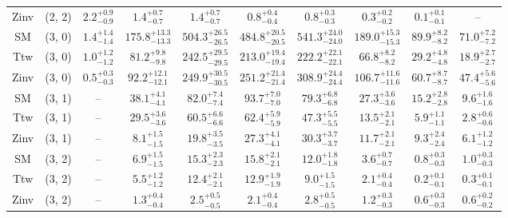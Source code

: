 \begin{table}[h!]
{\begin{tabular}{cccccccccc}
	Zinv & (2, 2) & $2.2^{+ 0.9 }_{- 0.9 }$ & $1.4^{+ 0.7 }_{- 0.7 }$ & $1.4^{+ 0.7 }_{- 0.7 }$ & $0.8^{+ 0.4 }_{- 0.4 }$ & $0.8^{+ 0.3 }_{- 0.3 }$ & $0.3^{+ 0.2 }_{- 0.2 }$ & $0.1^{+ 0.1 }_{- 0.1 }$ & -- \\[0.5ex] 
	SM & (3, 0) & $1.4^{+ 1.4 }_{- 1.4 }$ & $175.8^{+ 13.3 }_{- 13.3 }$ & $504.3^{+ 26.5 }_{- 26.5 }$ & $484.8^{+ 20.5 }_{- 20.5 }$ & $541.3^{+ 24.0 }_{- 24.0 }$ & $189.0^{+ 15.3 }_{- 15.3 }$ & $89.9^{+ 8.2 }_{- 8.2 }$ & $71.0^{+ 7.2 }_{- 7.2 }$ \\[0.5ex] 
	Ttw & (3, 0) & $1.0^{+ 1.2 }_{- 1.2 }$ & $81.2^{+ 9.8 }_{- 9.8 }$ & $242.5^{+ 29.5 }_{- 29.5 }$ & $213.0^{+ 19.4 }_{- 19.4 }$ & $222.2^{+ 22.1 }_{- 22.1 }$ & $66.8^{+ 8.2 }_{- 8.2 }$ & $29.2^{+ 4.8 }_{- 4.8 }$ & $18.9^{+ 2.7 }_{- 2.7 }$ \\[0.5ex] 
	Zinv & (3, 0) & $0.5^{+ 0.3 }_{- 0.3 }$ & $92.2^{+ 12.1 }_{- 12.1 }$ & $249.9^{+ 30.5 }_{- 30.5 }$ & $251.2^{+ 21.4 }_{- 21.4 }$ & $308.9^{+ 24.4 }_{- 24.4 }$ & $106.7^{+ 11.6 }_{- 11.6 }$ & $60.7^{+ 8.7 }_{- 8.7 }$ & $47.4^{+ 5.6 }_{- 5.6 }$ \\[0.5ex] 
	SM & (3, 1) & -- & $38.1^{+ 4.1 }_{- 4.1 }$ & $82.0^{+ 7.4 }_{- 7.4 }$ & $93.7^{+ 7.0 }_{- 7.0 }$ & $79.3^{+ 6.8 }_{- 6.8 }$ & $27.3^{+ 3.6 }_{- 3.6 }$ & $15.2^{+ 2.8 }_{- 2.8 }$ & $9.6^{+ 1.6 }_{- 1.6 }$ \\[0.5ex] 
	Ttw & (3, 1) & -- & $29.5^{+ 3.6 }_{- 3.6 }$ & $60.5^{+ 6.6 }_{- 6.6 }$ & $62.4^{+ 5.9 }_{- 5.9 }$ & $47.3^{+ 5.5 }_{- 5.5 }$ & $13.5^{+ 2.1 }_{- 2.1 }$ & $5.9^{+ 1.1 }_{- 1.1 }$ & $2.8^{+ 0.6 }_{- 0.6 }$ \\[0.5ex] 
	Zinv & (3, 1) & -- & $8.1^{+ 1.5 }_{- 1.5 }$ & $19.8^{+ 3.5 }_{- 3.5 }$ & $27.3^{+ 4.1 }_{- 4.1 }$ & $30.3^{+ 3.7 }_{- 3.7 }$ & $11.7^{+ 2.1 }_{- 2.1 }$ & $9.3^{+ 2.4 }_{- 2.4 }$ & $6.1^{+ 1.2 }_{- 1.2 }$ \\[0.5ex] 
	SM & (3, 2) & -- & $6.9^{+ 1.5 }_{- 1.5 }$ & $15.3^{+ 2.3 }_{- 2.3 }$ & $15.8^{+ 2.1 }_{- 2.1 }$ & $12.0^{+ 1.8 }_{- 1.8 }$ & $3.6^{+ 0.7 }_{- 0.7 }$ & $0.8^{+ 0.3 }_{- 0.3 }$ & $1.0^{+ 0.3 }_{- 0.3 }$ \\[0.5ex] 
	Ttw & (3, 2) & -- & $5.5^{+ 1.2 }_{- 1.2 }$ & $12.4^{+ 2.1 }_{- 2.1 }$ & $12.9^{+ 1.9 }_{- 1.9 }$ & $9.0^{+ 1.5 }_{- 1.5 }$ & $2.1^{+ 0.4 }_{- 0.4 }$ & $0.2^{+ 0.1 }_{- 0.1 }$ & $0.3^{+ 0.1 }_{- 0.1 }$ \\[0.5ex] 
	Zinv & (3, 2) & -- & $1.3^{+ 0.4 }_{- 0.4 }$ & $2.5^{+ 0.5 }_{- 0.5 }$ & $2.1^{+ 0.4 }_{- 0.4 }$ & $2.8^{+ 0.5 }_{- 0.5 }$ & $1.2^{+ 0.3 }_{- 0.3 }$ & $0.6^{+ 0.3 }_{- 0.3 }$ & $0.6^{+ 0.2 }_{- 0.2 }$ \\[0.5ex] 

\end{tabular}}
\end{table}
